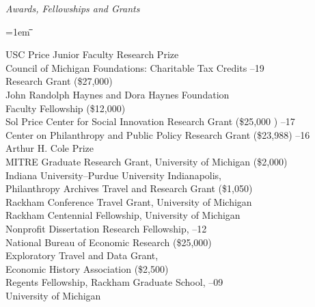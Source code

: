 \documentclass[12pt]{article}
\newlength{\midlength}
\newlength{\firstlength}
\newlength{\listindent}
\newlength{\dategap}
\newlength{\wrapgap}
\newcommand{\heading}[1]{
	{\setlength{\parskip}{0.8cm plus6mm minus3mm}
	\parindent=0pt
	\large \textit{{#1}}}
	\vspace{0.1em}
}
\newenvironment{datetabbing}{
	\begin{tabbing}
	\parskip=1em
	\hspace*{\listindent}\=\hspace*{\firstlength}\=\hspace*{\midlength}\= \kill
}{
	\end{tabbing}
}
\begin{document}
\heading{Awards, Fellowships and Grants}

\begin{datetabbing}
\>	USC Price Junior Faculty Research Prize								\> \>		2019		\'	\\[\dategap]
\>  Council of Michigan Foundations: Charitable Tax Credits				\> --19	\'	\\[\wrapgap]
\>\>		Research Grant (\$27,000)									\>							\\[\dategap]
\>  John Randolph Haynes and Dora Haynes Foundation						\>\>		2018		\' 	\\[\wrapgap]
\>\>		Faculty Fellowship (\$12,000)								\>							\\[\dategap]
\>	Sol Price Center for Social Innovation Research Grant (\$25,000	)	\>--17	\' 	\\[\dategap]
\>	Center on Philanthropy and Public Policy Research Grant (\$23,988)	\>--16	\' 	\\[\dategap]
\>	Arthur H. Cole Prize													\>		\' 	\\[\dategap]
\>	MITRE Graduate Research Grant, University of Michigan (\$2,000)		\>		\' 	\\[\dategap]
\>	Indiana University--Purdue University Indianapolis, 					\>\>		2012		\' 	\\[\wrapgap]
\>\>		Philanthropy Archives Travel and Research Grant	(\$1,050)	\>							\\[\dategap]
\>	Rackham Conference Travel Grant, University of Michigan				\>		\' 	\\[\dategap]
\>	Rackham Centennial Fellowship, University of Michigan				\>		\' 	\\[\dategap]
\>	Nonprofit Dissertation Research Fellowship, 							\>\>		2011--12	\' 	\\[\wrapgap]
\>\>		National Bureau of Economic Research (\$25,000)				\>					 		\\[\dategap]
\>	Exploratory Travel and Data Grant, 									\>		\' 	\\[\wrapgap]
\>\>		Economic History Association (\$2,500)						\>							\\[\dategap]
\>	Regents Fellowship, Rackham Graduate School, 						\>\>		2008--09	\' 	\\[\wrapgap]
\>\>		University of Michigan 										\>							%
\end{datetabbing}																					
\end{document}
